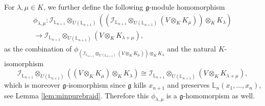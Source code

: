 \documentclass[a4paper,12pt]{article}
\theoremstyle{definition}
\theoremstyle{remark}
\begin{document}
For $\lambda,\mu\in K$, we further define the following $\mathfrak{g}$-module homomorphism
\begin{multline*}
	\phi_{\lambda,\mu}\colon
	\mathcal{I}_{\mathbb{L}_{n+1}}\otimes_{U(\mathbb{L}_{n+1})} ((\mathcal{I}_{\mathbb{L}_{n+1}}\otimes_{U(\mathbb{L}_{n+1})} (V\otimes_{K}K_{\mu}))\otimes_{K} K_{\lambda})	
	\\
	\longrightarrow
	\mathcal{I}_{\mathbb{L}_{n+1}}\otimes_{U(\mathbb{L}_{n+1})} (V\otimes_{K}K_{\lambda+\mu}),
\end{multline*}
as the combination of $\phi_{(\mathcal{I}_{\mathbb{L}_{n+1}}\otimes_{U(\mathbb{L}_{n+1})} (V\otimes_{K}K_{\mu}))\otimes_{K} K_{\lambda}}$
and the natural $K$-isomorphism
\[
	\mathcal{I}_{\mathbb{L}_{n+1}}\otimes_{U(\mathbb{L}_{n+1})} ((V\otimes_{K}K_{\mu})
	\otimes_{K} K_{\lambda})
	\cong
	\mathcal{I}_{\mathbb{L}_{n+1}}\otimes_{U(\mathbb{L}_{n+1})} (V\otimes_{K}K_{\lambda+\mu}),
\]
which is moreover $\mathfrak{g}$-isomorphism since $\mathfrak{g}$ kills $x_{n+1}$
and preserves $\mathbb{L}_{n}(x_{1},\ldots,x_{n})$, see Lemma \ref{lem:minpurebraid}.
Therefore this $\phi_{\lambda,\mu}$ is a $\mathfrak{g}$-homomorpism as well.
\end{document}
